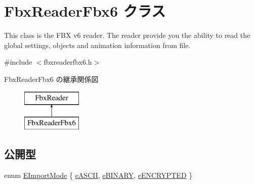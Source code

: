 \hypertarget{class_fbx_reader_fbx6}{}\section{Fbx\+Reader\+Fbx6 クラス}
\label{class_fbx_reader_fbx6}


This class is the F\+BX v6 reader. The reader provide you the ability to read the global settings, objects and animation information from file.  




{\ttfamily \#include $<$fbxreaderfbx6.\+h$>$}

Fbx\+Reader\+Fbx6 の継承関係図\begin{figure}[H]
\begin{center}
\leavevmode
\includegraphics[height=2.000000cm]{class_fbx_reader_fbx6}
\end{center}
\end{figure}
\subsection*{公開型}
\begin{DoxyCompactItemize}
\item 
enum \hyperlink{class_fbx_reader_fbx6_ac6bc45d165880315e2657abf7ca16495}{E\+Import\+Mode} \{ \hyperlink{class_fbx_reader_fbx6_ac6bc45d165880315e2657abf7ca16495a2cd7b49f48411efc36b3b9d095334ced}{e\+A\+S\+C\+II}, 
\hyperlink{class_fbx_reader_fbx6_ac6bc45d165880315e2657abf7ca16495ae23324d34805f8659977df8340743af1}{e\+B\+I\+N\+A\+RY}, 
\hyperlink{class_fbx_reader_fbx6_ac6bc45d165880315e2657abf7ca16495af8fb0ae704cf55ad6d0df690c7242b2a}{e\+E\+N\+C\+R\+Y\+P\+T\+ED}
 \}
\end{DoxyCompactItemize}
